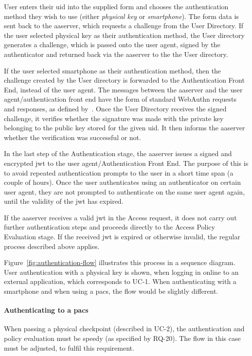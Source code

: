 User enters their \acrshort{uid} into the supplied form and chooses the authentication method they wish to use (either \textit{physical key} or \textit{smartphone}). The form data is sent back to the \acrshort{aaserver}, which requests a challenge from the User Directory. If the user selected physical key as their authentication method, the User directory generates a challenge, which is passed onto the user agent, signed by the authenticator and returned back via the \acrshort{aaserver} to the the User directory.

If the user selected smartphone as their authentication method, then the challenge created by the User directory is forwarded to the Authentication Front End, instead of the user agent. The messages between the \acrshort{aaserver} and the user agent/authentication front end have the form of standard WebAuthn requests and responses, as defined by~\cite{Balfanz2019Web1}. 
Once the User Directory receives the signed challenge, it verifies whether the signature was made with the private key belonging to the public key stored for the given \acrshort{uid}. It then informs the \acrshort{aaserver} whether the verification was successful or not.

In the last step of the Authentication stage, the \acrshort{aaserver} issues a signed and encrypted \acrshort{jwt} to the user agent/Authentication Front End. The purpose of this is to avoid repeated authentication prompts to the user in a short time span (a couple of hours). Once the user authenticates using an authenticator on certain user agent, they are not prompted to authenticate on the same user agent again, until the validity of the \acrshort{jwt} has expired.

If the \acrshort{aaserver} receives a valid \acrshort{jwt} in the Access request, it does not carry out further authentication steps and proceeds directly to the Access Policy Evaluation stage. If the received \acrshort{jwt} is expired or otherwise invalid, the regular process described above applies.

Figure~\ref{fig:authentication-flow} illustrates this process in a sequence diagram. User authentication with a physical key is shown, when logging in online to an external application, which corresponds to UC-1. When authenticating with a smartphone and when using a \acrshort{pacs}, the flow would be slightly different.

\paragraph{Authenticating to a \acrshort{pacs}} 
When passing a physical checkpoint (described in UC-2), the authentication and policy evaluation must be speedy (as specified by RQ-20). The flow in this case must be adjusted, to fulfil this requirement.

